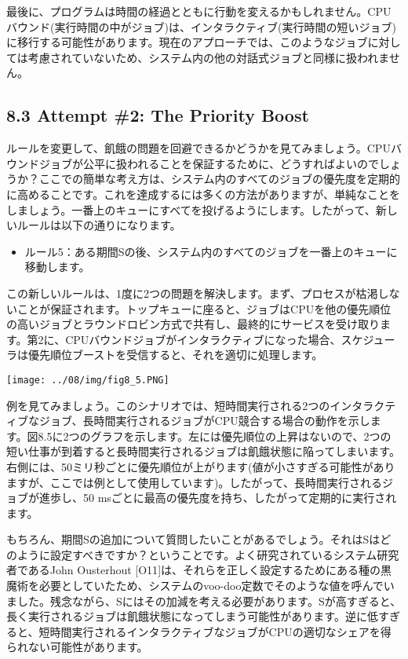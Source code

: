 最後に、プログラムは時間の経過とともに行動を変えるかもしれません。CPUバウンド(実行時間の中がジョブ)は、インタラクティブ(実行時間の短いジョブ)に移行する可能性があります。現在のアプローチでは、このようなジョブに対しては考慮されていないため、システム内の他の対話式ジョブと同様に扱われません。

\hypertarget{attempt-2-the-priority-boost}{%
\subsection*{8.3 Attempt \#2: The Priority
Boost}\label{attempt-2-the-priority-boost}}

ルールを変更して、飢餓の問題を回避できるかどうかを見てみましょう。CPUバウンドジョブが公平に扱われることを保証するために、どうすればよいのでしょうか？ここでの簡単な考え方は、システム内のすべてのジョブの優先度を定期的に高めることです。これを達成するには多くの方法がありますが、単純なことをしましょう。一番上のキューにすべてを投げるようにします。したがって、新しいルールは以下の通りになります。

\begin{itemize}
\tightlist
\item
  ルール5：ある期間Sの後、システム内のすべてのジョブを一番上のキューに移動します。
\end{itemize}

この新しいルールは、1度に2つの問題を解決します。まず、プロセスが枯渇しないことが保証されます。トップキューに座ると、ジョブはCPUを他の優先順位の高いジョブとラウンドロビン方式で共有し、最終的にサービスを受け取ります。第2に、CPUバウンドジョブがインタラクティブになった場合、スケジューラは優先順位ブーストを受信すると、それを適切に処理します。

\texttt{[image: ../08/img/fig8\_5.PNG]}

例を見てみましょう。このシナリオでは、短時間実行される2つのインタラクティブなジョブ、長時間実行されるジョブがCPU競合する場合の動作を示します。図8.5に2つのグラフを示します。左には優先順位の上昇はないので、2つの短い仕事が到着すると長時間実行されるジョブは飢餓状態に陥ってしまいます。右側には、50ミリ秒ごとに優先順位が上がります(値が小さすぎる可能性がありますが、ここでは例として使用しています)。したがって、長時間実行されるジョブが進歩し、50
msごとに最高の優先度を持ち、したがって定期的に実行されます。

もちろん、期間Sの追加について質問したいことがあるでしょう。それはSはどのように設定すべきですか？ということです。よく研究されているシステム研究者であるJohn
Ousterhout
{[}O11{]}は、それらを正しく設定するためにある種の黒魔術を必要としていたため、システムのvoo-doo定数でそのような値を呼んでいました。残念ながら、Sにはその加減を考える必要があります。Sが高すぎると、長く実行されるジョブは飢餓状態になってしまう可能性があります。逆に低すぎると、短時間実行されるインタラクティブなジョブがCPUの適切なシェアを得られない可能性があります。

